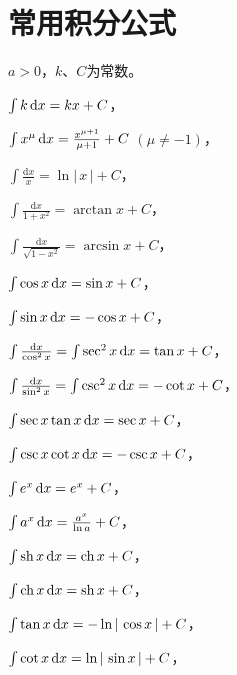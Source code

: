 \documentclass[UTF8]{ctexbook}
\begin{document}
\section{常用积分公式}
\qquad \qquad \qquad \qquad $a>0$，$k$、$C$为常数。
  \begin{tabenum}[(1)] \qquad \qquad
    \item $ \int k \,\mathrm{d} x                             = kx+C $，
    \item $ \int x^\mu \,\mathrm{d} x                           = \frac{x^{\mu +1}}{\mu +1}+C $ $(\mu \ne -1) $，\\
    \item $ \int \frac{\mathrm{d} x}{x}              = \ln |\,x\,|+C $，\\
    \item $ \int \frac{\mathrm{d} x}{1+x^2}          = \arctan x +C $，\\
    \item $ \int \frac{\mathrm{d} x}{\sqrt{1-x^2}}   = \arcsin x +C $，\\
    \item $ \int \cos x \,\mathrm{d} x                          = \sin x+C $，
    \item $ \int \sin x \,\mathrm{d} x                          = -\cos x +C $，\\
    \item $ \int \frac{\mathrm{d}x}{\cos ^2 x}       = \int \sec^2 x \,\mathrm{d} x=\tan x+C $，
    \item $ \int \frac{\mathrm{d}x}{\sin ^2 x}       = \int \csc^2 x \,\mathrm{d} x=-\cot x+C $，\\
    \item $ \int \sec x \tan x \,\mathrm{d} x                   = \sec x+C $，
    \item $ \int \csc x \cot x \,\mathrm{d} x                   = -\csc x+C $，\\
    \item $ \int e^x \,\mathrm{d} x                             = e^x+C $，
    \item $ \int a^x \,\mathrm{d} x                             = \frac{a^x}{\ln a}+C$，\\
    \item $ \int \mathrm{sh}\,x \,\mathrm{d} x=\mathrm{ch}\,x+C  $，
    \item $ \int \mathrm{ch}\,x \,\mathrm{d} x=\mathrm{sh}\,x+C $，\\
    \item $ \int \tan x \,\mathrm{d} x =-\ln |\,\cos x \,|+C $，
    \item $ \int \cot x \,\mathrm{d} x =\ln |\,\sin x \,|+C $，\\

\end{tabenum}
\end{document}
